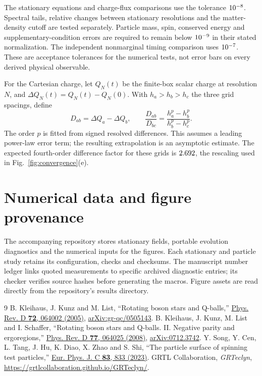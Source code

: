 \documentclass[10pt,twocolumn,floatfix,aps,prd,superscriptaddress,nofootinbib]{revtex4-2}
\begin{document}
The stationary equations and charge-flux comparisons use the tolerance
$10^{-8}$. Spectral tails, relative changes between stationary
resolutions and the matter-density cutoff are tested separately. Particle
mass, spin, conserved energy and supplementary-condition errors are required
to remain below $10^{-9}$ in their stated normalization.
The independent nonmarginal timing comparison uses $10^{-7}$.
These are acceptance tolerances for the numerical tests, not error bars on
every derived physical observable.

For the Cartesian charge, let $Q_N(t)$ be the finite-box scalar charge at
resolution $N$, and $\Delta Q_N(t)=Q_N(t)-Q_N(0)$. With
$h_a>h_b>h_c$ the three grid spacings, define
\begin{equation}
 D_{ab}=\Delta Q_a-\Delta Q_b,\qquad
 \frac{D_{ab}}{D_{bc}}=
 \frac{h_a^p-h_b^p}{h_b^p-h_c^p}.
 \label{eq:richardson}
\end{equation}
The order $p$ is fitted from signed resolved differences. This assumes a
leading power-law error term; the resulting extrapolation is an asymptotic
estimate. The expected fourth-order difference factor for these grids is
$2.692$, the rescaling used in
Fig.~\ref{fig:convergence}(e).


\section{Numerical data and figure provenance}
\label{app:data}

The accompanying repository stores stationary fields, portable evolution
diagnostics and the numerical inputs for the figures. Each stationary and
particle study retains its configuration, checks and checksums. The manuscript
number ledger links quoted measurements to specific archived diagnostic
entries; its checker verifies source hashes before generating the macros.
Figure assets are read directly from the repository's results directory.

\begin{thebibliography}{9}
B. Kleihaus, J. Kunz and M. List,
``Rotating boson stars and Q-balls,''
\href{https://doi.org/10.1103/PhysRevD.72.064002}{Phys. Rev. D \textbf{72}, 064002 (2005)},
\href{https://arxiv.org/abs/gr-qc/0505143}{arXiv:gr-qc/0505143}.
B. Kleihaus, J. Kunz, M. List and I. Schaffer,
``Rotating boson stars and Q-balls. II. Negative parity and ergoregions,''
\href{https://doi.org/10.1103/PhysRevD.77.064025}{Phys. Rev. D \textbf{77}, 064025 (2008)},
\href{https://arxiv.org/abs/0712.3742}{arXiv:0712.3742}.
Y. Song, Y. Cen, L. Tang, J. Hu, K. Diao, X. Zhao and S. Shi,
``The particle surface of spinning test particles,''
\href{https://doi.org/10.1140/epjc/s10052-023-11970-5}{Eur. Phys. J. C \textbf{83}, 833 (2023)}.
GRTL Collaboration, \emph{GRTeclyn},
\url{https://grtlcollaboration.github.io/GRTeclyn/}.
\end{thebibliography}
\end{document}
